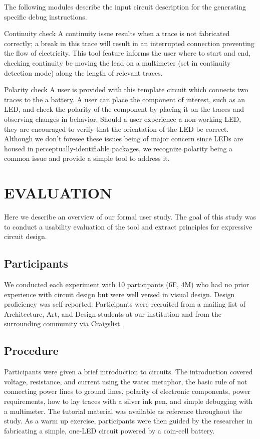 \documentclass{sigchi}
\begin{document}
        The following modules describe the input circuit description for the generating specific debug instructions. 

        Continuity check
        A continuity issue results when a trace is not fabricated correctly; a break in this trace will result in an interrupted connection preventing the flow of electricity. This tool feature informs the user where to start and end, checking continuity be moving the lead on a multimeter (set in continuity detection mode) along the length of relevant traces. 
        
        Polarity check
        A user is provided with this template circuit which connects two traces to the a battery. A user can place the component of interest, such as an LED, and check the polarity of the component by placing it on the traces and observing changes in behavior. Should a user experience a non-working LED, they are encouraged to verify that the orientation of the LED be correct. Although we don't foresee these issues being of major concern since LEDs are housed in perceptually-identifiable packages, we recognize polarity being a common issue and provide a simple tool to address it. 

        
    
        
\section{EVALUATION}
    Here we describe an overview of our formal user study. The goal of this study was to conduct a usability evaluation of the tool and extract principles for expressive circuit design. 

\subsection{Participants}
    We conducted each experiment with 10 participants (6F, 4M) who had no prior experience with circuit design but were well versed in visual design. Design proficiency was self-reported. Participants were recruited from a mailing list of Architecture, Art, and Design students at our institution and from the surrounding community via Craigslist. 
    
\subsection{Procedure}
    Participants were given a brief introduction to circuits. The introduction covered voltage, resistance, and current using the water metaphor, the basic rule of not connecting power lines to ground lines, polarity of electronic components, power requirements, how to lay traces with a silver ink pen, and simple debugging with a multimeter. The tutorial material was available as reference throughout the study. As a warm up exercise, participants were then guided by the researcher in fabricating a simple, one-LED circuit powered by a coin-cell battery.   
\end{document}
